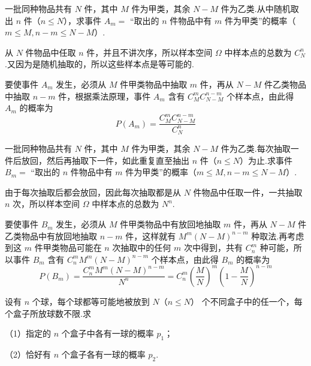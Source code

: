 \begin{example}[][不放回抽样]
    \indent 一批同种物品共有 $N$ 件，其中 $M$ 件为甲类，其余 $N-M$ 件为乙类.从中随机取出 $n$ 件（$n \leqslant N$），求事件 $A_m=$ “取出的 $n$ 件物品中有 $m$ 件为甲类”的概率（$m \leqslant M, n-m \leqslant N-M$）.
\end{example}

\begin{solution}
    从 $N$ 件物品中任取 $n$ 件，并且不讲次序，所以样本空间 $\varOmega$ 中样本点的总数为 $C_N^n$.又因为是随机抽取的，所以这些样本点是等可能的.

    要使事件 $A_m$ 发生，必须从 $M$ 件甲类物品中抽取 $m$ 件，再从 $N-M$ 件乙类物品中抽取 $n-m$ 件，根据乘法原理，事件 $A_m$ 含有 $C_M^m C_{N-M}^{n-m}$ 个样本点，由此得 $A_m$ 的概率为
    $$
    P(A_m) = \dfrac{C_M^m C_{N-M}^{n-m}}{C_N^n}
    $$
\end{solution}

\begin{example}[][放回抽样]
    \indent 一批同种物品共有 $N$ 件，其中 $M$ 件为甲类，其余 $N-M$ 件为乙类.每次抽取一件后放回，然后再抽取下一件，如此重复直至抽出 $n$ 件（$n \leqslant N$）为止.求事件 $B_m=$ “取出的 $n$ 件物品中有 $m$ 件为甲类”的概率（$m \leqslant M, n-m \leqslant N-M$）.
\end{example}

\begin{solution}
    由于每次抽取后都会放回，因此每次抽取都是从 $N$ 件物品中任取一件，一共抽取 $n$ 次，所以样本空间 $\varOmega$ 中样本点的总数为 $N^n$.

    要使事件 $B_m$ 发生，必须从 $M$ 件甲类物品中有放回地抽取 $m$ 件，再从 $N-M$ 件乙类物品中有放回地抽取 $n-m$ 件，这样就有 $M^m (N-M)^{n-m}$ 种取法.再考虑到这 $m$ 件甲类物品可能在 $n$ 次抽取中的任何 $m$ 次中得到，共有 $C_n^m$ 种可能，所以事件 $B_m$ 含有 $C_n^m M^m (N-M)^{n-m}$ 个样本点，由此得 $B_m$ 的概率为
    $$
    P(B_m) = \dfrac{C_n^m M^m (N-M)^{n-m}}{N^n} = C_n^m \left( \dfrac{M}{N} \right)^m \left( 1 - \dfrac{M}{N} \right)^{n-m}
    $$
\end{solution}

\begin{example}[][盒子模型]
    \indent 设有 $n$ 个球，每个球都等可能地被放到 $N$（$n \leqslant N$） 个不同盒子中的任一个，每个盒子所放球数不限.求

    （1）指定的 $n$ 个盒子中各有一球的概率 $p_1$；

    （2）恰好有 $n$ 个盒子各有一球的概率 $p_2$.
\end{example}

